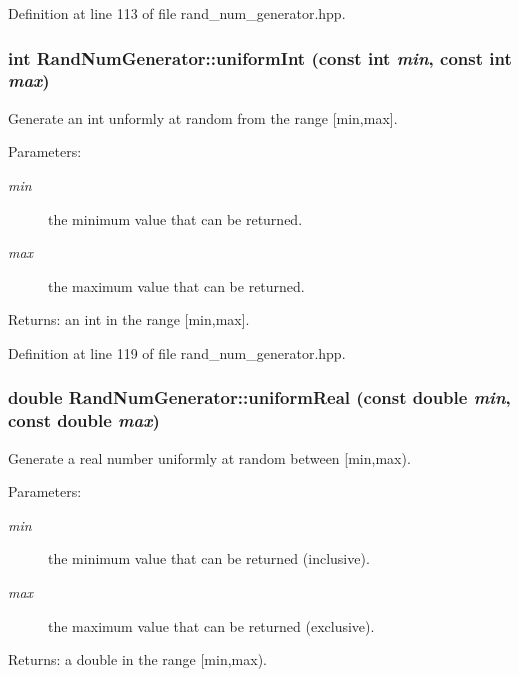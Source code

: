 Definition at line 113 of file rand\_\-num\_\-generator.hpp.
\subsubsection{\setlength{\rightskip}{0pt plus 5cm}int Rand\-Num\-Generator::uniform\-Int (const int {\em min}, const int {\em max})\hspace{0.3cm}{\tt  [inline]}}\label{classRandNumGenerator_5fbb12224e41a4ae4dc7f6a9faa00820}


Generate an int unformly at random from the range [min,max]. 

\begin{Desc}
\item[Parameters:]
\begin{description}
\item[{\em min}]the minimum value that can be returned. \item[{\em max}]the maximum value that can be returned. \end{description}
\end{Desc}
\begin{Desc}
\item[Returns:]an int in the range [min,max]. \end{Desc}


Definition at line 119 of file rand\_\-num\_\-generator.hpp.
\subsubsection{\setlength{\rightskip}{0pt plus 5cm}double Rand\-Num\-Generator::uniform\-Real (const double {\em min}, const double {\em max})\hspace{0.3cm}{\tt  [inline]}}\label{classRandNumGenerator_7f44fe6e85086631638b03fa7477e050}


Generate a real number uniformly at random between [min,max). 

\begin{Desc}
\item[Parameters:]
\begin{description}
\item[{\em min}]the minimum value that can be returned (inclusive). \item[{\em max}]the maximum value that can be returned (exclusive). \end{description}
\end{Desc}
\begin{Desc}
\item[Returns:]a double in the range [min,max). \end{Desc}


